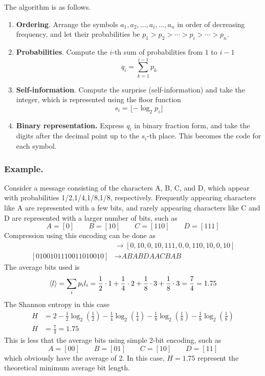 \documentclass[../../../main.tex]{subfiles}
\begin{document}
The algorithm is as follows.
\begin{enumerate}
  \item \textbf{Ordering}.
        Arrange the symbols $a_1,a_2,\ldots,a_i,\ldots,a_n$ in order of decreasing frequency, and let their probabilities be $p_1>p_2>\cdots>p_i>\cdots>p_n$.
  \item \textbf{Probabilities}.
        Compute the $i$-th sum of probabilities from $1$ to $i-1$
        \begin{equation*}
          q_i = \sum_{k=1}^{i-1} p_k
        \end{equation*}
  \item \textbf{Self-information}.
        Compute the surprise (self-information) and take the integer, which is represented using the floor function
        \begin{equation*}
          s_i = \lfloor -\log_2 p_i \rfloor
        \end{equation*}
  \item \textbf{Binary representation.}
        Express $q_i$ in binary fraction form, and take the digits after the decimal point up to the $s_i$-th place.
        This becomes the code for each symbol.
\end{enumerate}

\subsubsection{Example.}
Consider a message consisting of the characters A, B, C, and D, which appear with probabilities 1/2,1/4,1/8,1/8, respectively.
Frequently appearing characters like A are represented with a few bits, and rarely appearing characters like C and D are represented with a larger number of bits, such as
\begin{equation*}
  A = [0] \qquad B = [10]\qquad C = [110]\qquad  D = [111]
\end{equation*}
Compression using this encoding can be done as
\begin{align*}
  [0100101110011010010]
   & \rightarrow [0,10,0,10,111,0,0,110,10,0,10] \\
  [0100101110011010010]
   & \rightarrow \textit{ABABDAACBAB}
\end{align*}
The average bits used is
\begin{equation*}
  \braket{l } = \sum_{i } p_i l_i =
  \frac{1}{2}\cdot 1 + \frac{1}{4}\cdot 2 + \frac{1}{8}\cdot 3 + \frac{1}{8}\cdot 3 = \frac{7}{4} = 1.75
\end{equation*}
The Shannon entropy in this case
\begin{align*}
  H & = 2 -\frac{1}{2}\log_2\left(\frac{1}{2}\right) - \frac{1}{4}\log_2\left(\frac{1}{4}\right) - \frac{1}{8}\log_2\left(\frac{1}{8}\right) - \frac{1}{8}\log_2\left(\frac{1}{8}\right) \\
  H & =  \frac{7}{4} = 1.75
\end{align*}
This is less that the average bits using simple 2-bit encoding, such as
\begin{equation*}
  A = [00] \qquad B = [01] \qquad C = [10]\qquad  D = [11]
\end{equation*}
which obviously have the average of 2.
In this case, $H=1.75$ represent the theoretical minimum average bit length.
\end{document}
